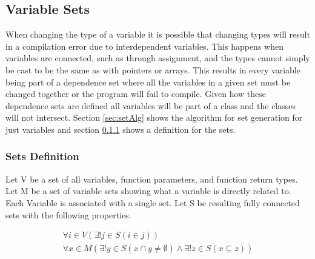 \documentclass[natbib]{article}
\begin{document}
\subsection{Variable Sets}
When changing the type of a variable it is possible that changing types will result in a 
compilation error due to interdependent variables. This happens when variables are connected, 
such as through assignment, and the types cannot simply be cast to be the same as with pointers 
or arrays. This results in every variable being part of a dependence set where all the variables 
in a given set must be changed together or the program will fail to compile. Given how these 
dependence sets are defined all variables will be part of a class and the classes will not intersect. 
Section \ref{sec:setAlg} shows the algorithm for set generation for just variables and 
section \ref{sec:setDef} shows a definition for the sets.
\subsubsection{Sets Definition} \label{sec:setDef}
Let V be a set of all variables, function parameters, and function return types.
Let M be a set of variable sets showing what a variable is directly related to. Each Variable is associated with a single set.
Let S be resulting fully connected sets with the following properties.

\begin{gather*} 
\forall i \in V(\exists! j \in S(i \in j))\\
\forall x \in M(\exists! y \in S(x \cap y \neq \emptyset) \wedge 
\exists! z \in S(x \subseteq z))
\end{gather*}
\end{document}
